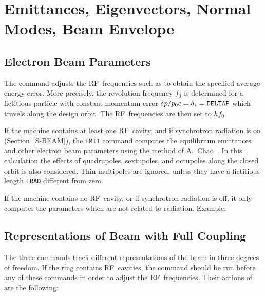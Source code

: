 \section{Emittances, Eigenvectors, Normal Modes, Beam Envelope}

\subsection{Electron Beam Parameters}
\label{S-EMIT}
The command
adjusts the RF~frequencies such as to obtain the specified average
energy error.
More precisely,
the revolution frequency \(f_0\) is determined for a fictitious particle
with constant momentum error
\(\delta p / p_0 c = \delta_s = \hbox{\tt DELTAP}\)
which travels along the design orbit.
The RF~frequencies are then set to \(h f_0\).

If the machine contains at least one RF~cavity, and if synchrotron
radiation is on (Section~\ref{S-BEAM}),
the {\tt EMIT} command computes the equilibrium emittances and other
electron beam parameters using the method of A.~Chao~\cite{B-CHAO}.
In this calculation the effects of quadrupoles, sextupoles, and
octupoles along the closed orbit is also considered.
Thin multipoles are ignored,
unless they have a fictitious length {\tt LRAD} different from zero.

If the machine contains no RF~cavity, or if synchrotron radiation is
off, it only computes the parameters which are not related to
radiation.
Example:

\subsection{Representations of Beam with Full Coupling}
\label{S-EIGEN}
\label{S-ENVE}
\label{S-TWS3}
The three commands
track different representations of the beam in three degrees of
freedom.
If the ring contains RF~cavities, the command  should be run
before any of these commands in order to adjust the RF~frequencies.
Their actions of are the following:

